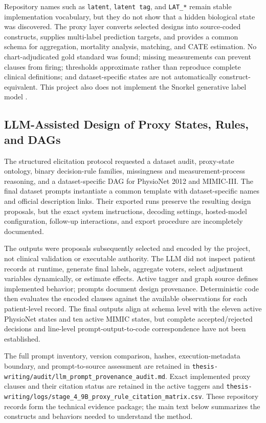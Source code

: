 Repository names such as \texttt{latent}, \texttt{latent tag}, and \texttt{LAT\_*} remain stable implementation vocabulary, but they do not show that a hidden biological state was discovered.  The proxy layer converts selected designs into source-coded constructs, supplies multi-label prediction targets, and provides a common schema for aggregation, mortality analysis, matching, and CATE estimation.  No chart-adjudicated gold standard was found; missing measurements can prevent clauses from firing; thresholds approximate rather than reproduce complete clinical definitions; and dataset-specific states are not automatically construct-equivalent.  This project also does not implement the Snorkel generative label model \cite{ratner_et_al_2020_snorkel}.

\subsection{LLM-Assisted Design of Proxy States, Rules, and DAGs}
\label{subsec:clinical-proxy-state-construction:llm-assisted-elicitation}

The structured elicitation protocol requested a dataset audit, proxy-state ontology, binary decision-rule families, missingness and measurement-process reasoning, and a dataset-specific DAG for PhysioNet 2012 and MIMIC-III.  The final dataset prompts instantiate a common template with dataset-specific names and official description links.  Their exported runs preserve the resulting design proposals, but the exact system instructions, decoding settings, hosted-model configuration, follow-up interactions, and export procedure are incompletely documented.

The outputs were proposals subsequently selected and encoded by the project, not clinical validation or executable authority.  The LLM did not inspect patient records at runtime, generate final labels, aggregate voters, select adjustment variables dynamically, or estimate effects.  Active tagger and graph source defines implemented behavior; prompts document design provenance.  Deterministic code then evaluates the encoded clauses against the available observations for each patient-level record.  The final outputs align at schema level with the eleven active PhysioNet states and ten active MIMIC states, but complete accepted/rejected decisions and line-level prompt-output-to-code correspondence have not been established.

The full prompt inventory, version comparison, hashes, execution-metadata boundary, and prompt-to-source assessment are retained in \nolinkurl{thesis-writing/audit/llm_prompt_provenance_audit.md}.  Exact implemented proxy clauses and their citation status are retained in the active taggers and \nolinkurl{thesis-writing/logs/stage_4_9B_proxy_rule_citation_matrix.csv}.  These repository records form the technical evidence package; the main text below summarizes the constructs and behaviors needed to understand the method.

